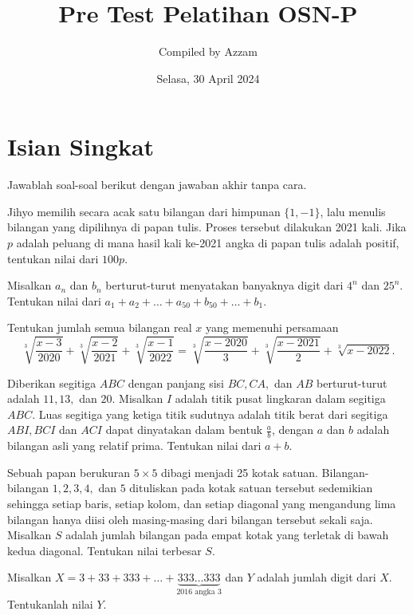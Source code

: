 \documentclass[11pt]{scrartcl}
\begin{document}
	\title{Pre Test Pelatihan OSN-P} %
	\date{Selasa, 30 April 2024}
	\author{Compiled by Azzam}
	\maketitle
	\newpage
	
	\section{Isian Singkat}
	Jawablah soal-soal berikut dengan jawaban akhir tanpa cara.
	
	\begin{soalbaru}
		Jihyo memilih secara acak satu bilangan dari himpunan $\{1,-1\}$, lalu menulis bilangan yang dipilihnya di papan tulis. Proses tersebut dilakukan 2021 kali. Jika $p$ adalah peluang di mana hasil kali ke-2021 angka di papan tulis adalah positif, tentukan nilai dari $100p$.
	\end{soalbaru}
	
	
	\begin{soalbaru}
		Misalkan $a_n$ dan $b_n$ berturut-turut menyatakan banyaknya digit dari $4^n$ dan $25^n$. Tentukan nilai dari $a_1+a_2+\dots +a_{50}+b_{50}+\dots+b_1$.
		
	\end{soalbaru}
	
	\begin{soalbaru}
		Tentukan jumlah semua bilangan real $x$ yang memenuhi persamaan $$\sqrt[3]{\frac{x-3}{2020}}+\sqrt[3]{\frac{x-2}{2021}}+\sqrt[3]{\frac{x-1}{2022}}=\sqrt[3]{\frac{x-2020}{3}}+\sqrt[3]{\frac{x-2021}{2}}+\sqrt[3]{x-2022}.$$
	\end{soalbaru}
	
	\begin{soalbaru}
		Diberikan segitiga $ABC$ dengan panjang sisi $BC,CA,$ dan $AB$ berturut-turut adalah $11,13,$ dan $20$. Misalkan $I$ adalah titik pusat lingkaran dalam segitiga $ABC$. Luas segitiga yang ketiga titik sudutnya adalah titik berat dari segitiga $ABI,BCI$ dan $ACI$ dapat dinyatakan dalam bentuk $\frac{a}{b}$, dengan $a$ dan $b$ adalah bilangan asli yang relatif prima. Tentukan nilai dari $a+b$.
	\end{soalbaru}
	
	\begin{soalbaru}
		Sebuah papan berukuran $5 \times 5$ dibagi menjadi 25 kotak satuan. Bilangan-bilangan $1,2,3,4,$ dan $5$ dituliskan pada kotak satuan tersebut sedemikian sehingga setiap baris, setiap kolom, dan setiap diagonal yang mengandung lima bilangan hanya diisi oleh masing-masing dari bilangan tersebut sekali saja. Misalkan $S$ adalah jumlah bilangan pada empat kotak yang terletak di bawah kedua diagonal. Tentukan nilai terbesar $S$.
	\end{soalbaru}
	\begin{soalbaru}
		Misalkan $X = 3 + 33 + 333 + \dots + \underbrace{333 \dots 333}_{2016 \text{ angka } 3}$ dan $Y$ adalah jumlah digit dari $X$. Tentukanlah nilai $Y$.
	\end{soalbaru}
	
\end{document}
